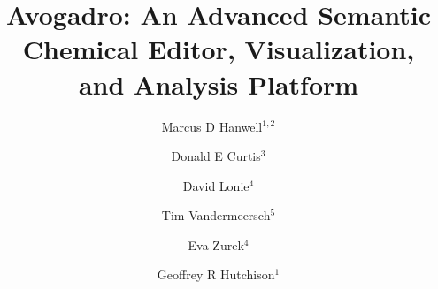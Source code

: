 \documentclass[10pt]{bmc_article}
\newenvironment{bmcformat}{\begin{raggedright}
\baselineskip20pt\sloppy\setboolean{publ}{false}}{\end{raggedright}
\baselineskip20pt\sloppy}
\begin{document}
\begin{bmcformat}



\title{Avogadro: An Advanced Semantic Chemical Editor, Visualization, and
  Analysis Platform}

\author{Marcus D Hanwell\correspondingauthor$^{1, 2}$%
  \and
  Donald E Curtis$^3$%
  \and
  David Lonie$^4$%
  \and
  Tim Vandermeersch$^5$%
  \and
  Eva Zurek$^4$%
  \and
  Geoffrey R Hutchison$^1$%
  }


\address{%
  \iid(1)Department of Chemistry, University of Pittsburgh, 219 Parkman Avenue,
Pittsburgh, PA, 15260, USA\\
  \iid(2)Department of Scientific Computing, Kitware, Inc., 28 Corporate Drive,
Clifton Park, NY, 12065, USA\\
  \iid(3)Department of Computer Science, Coe College, 1220 First Avenue NE,
Cedar Rapids, Iowa 52402\\
  \iid(4)Department of Chemistry, State University of New York at Buffalo,
Buffalo, New York 14260-3000\\
  \iid(5)Avogadro development team
}%

\maketitle


\end{bmcformat}
\end{document}
